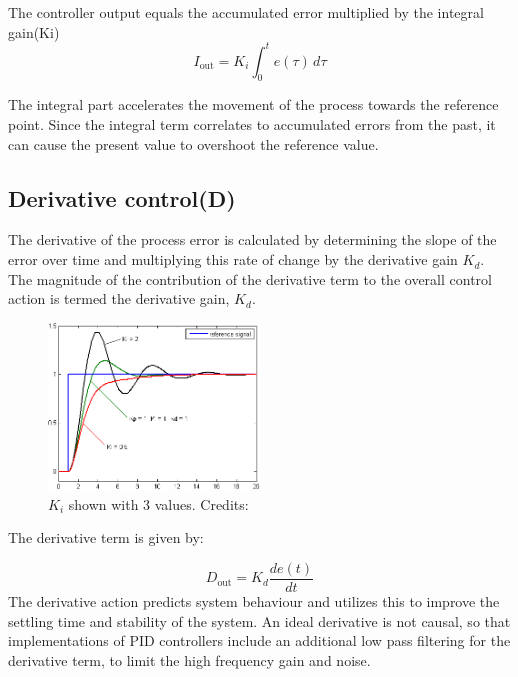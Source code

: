 The controller output equals the accumulated error multiplied by the integral gain(Ki)\\
$$I_{\mathrm{out}}=K_{i}\int_{0}^{t}{e(\tau)}\,{d\tau}$$ 

The integral part accelerates the movement of the process towards the reference point.
Since the integral term correlates to accumulated errors from the past, it can cause the present value to overshoot the reference value.

\subsection {Derivative control(D)} 

The derivative of the process error is calculated by determining the slope of the error over time and multiplying this rate of change by the derivative gain $K_d$. The magnitude of the contribution of the derivative term to the overall control action is termed the derivative gain, $K_d$.
\begin{figure}[h!]
  \centering
  \includegraphics[width=0.5\textwidth]{figures/Change_with_Ki.png}
  
  \caption{$K_i$ shown with 3 values. Credits: %
  }
  \label{PID controller}
\end{figure}

The derivative term is given by:

$$D_{\mathrm{out}}=K_d\frac{de(t)}{dt}$$
The derivative action predicts system behaviour and utilizes this to improve the settling time and stability of the system.
An ideal derivative is not causal, so that implementations of PID controllers include an additional low pass filtering for the derivative term, to limit the high frequency gain and noise.

